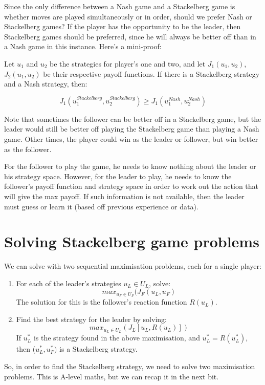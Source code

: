 Since the only difference between a Nash game and a Stackelberg game is whether
moves are played simultaneously or in order, should we prefer Nash or
Stackelberg games? If the player has the opportunity to be the leader, then
Stackelberg games should be preferred, since he will always be better off than
in a Nash game in this instance. Here's a mini-proof:

Let $u_1$ and $u_2$ be the strategies for player's one and two, and let
$J_1(u_1, u_2)$, $J_2(u_1, u_2)$ be their respective payoff functions. If there
is a Stackelberg strategy and a Nash strategy, then:

\[
  J_1(u^{Stackelberg}_1, u^{Stackelberg}_2) \geq J_1(u^{Nash}_1, u^{Nash}_2)
\]

Note that sometimes the follower can be better off in a Stackelberg game, but
the leader would still be better off playing the Stackelberg game than playing a
Nash game. Other times, the player could win as the leader or follower, but win
better as the follower.

For the follower to play the game, he needs to know nothing about the leader or
his strategy space. However, for the leader to play, he needs to know the
follower's payoff function and strategy space in order to work out the action
that will give the max payoff. If such information is not available, then the
leader must guess or learn it (based off previous experience or data).


\section{Solving Stackelberg game problems}

We can solve with two sequential maximisation problems, each for a single
player:

\begin{enumerate}
  \item For each of the leader's strategies $u_L \in U_L$, solve:
    \[
      max_{u_F \in U_F}(J_F(u_L, u_F)
    \]
    The solution for this is the follower's reaction function $R(u_L)$.
  \item Find the best strategy for the leader by solving:
    \[
      max_{u_L \in U_L}(J_L[u_L, R(u_L)])
    \]
    If $u^*_L$ is the strategy found in the above maximisation, and
    $u^*_L = R(u^*_L)$, then ($u^*_L, u^*_F)$ is a Stackelberg strategy.
\end{enumerate}

So, in order to find the Stackelberg strategy, we need to solve two maximisation
problems. This is A-level maths, but we can recap it in the next bit.

